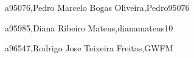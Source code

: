 a95076,Pedro Marcelo Bogas Oliveira,Pedro95076

a95985,Diana Ribeiro Mateus,dianamateus10

a96547,Rodrigo Jose Teixeira Freitas,GWFM 